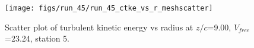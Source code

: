 \begin{figure}[H]
\centering
\texttt{[image: figs/run\_45/run\_45\_ctke\_vs\_r\_meshscatter]}
\caption{Scatter plot of turbulent kinetic energy vs radius at $z/c$=9.00, $V_{free}$=23.24, station 5.}
\label{fig:run_45_ctke_vs_r_meshscatter}
\end{figure}


